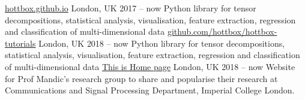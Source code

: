 

\begin{cventries}
            {\href{https://hottbox.github.io}{hottbox.github.io}} %
            {London, UK} %
            {2017 -- now} %
            { %
                Python library for tensor decompositions, statistical analysis, visualisation, feature extraction, regression and classification of multi-dimensional data
            }
            {\href{https://github.com/hottbox/hottbox-tutorials}{github.com/hottbox/hottbox-tutorials}} %
            {London, UK} %
            {2018 -- now} %
            { %
                Python library for tensor decompositions, statistical analysis, visualisation, feature extraction, regression and classification of multi-dimensional data
            }
            {\href{http://www.commsp.ee.ic.ac.uk/~csp-mandic/}{This is Home page}} %
            {London, UK} %
            {2018 -- now} %
            { %
                Website for Prof Mandic's research group to share and popularise their research at Communications and Signal Processing Department, Imperial College London.
            }
\end{cventries}
